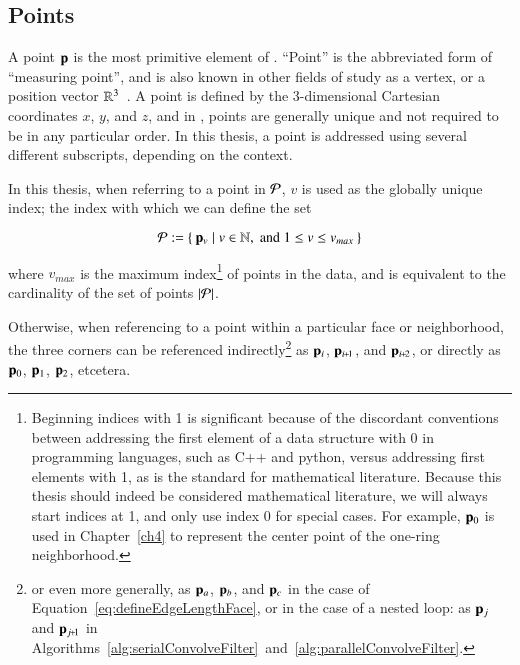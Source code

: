 %
%
%
%
\subsection{Points}
\label{ch2sTDDssP}
A point $\mathbf{p}$ is the most primitive element of \tdd{}. ``Point'' is the abbreviated form of ``measuring point'', and is also known in other fields of study as a vertex, or a position vector $\mathbb{R}^{3}$~\cite{Weisstein19l}. A point is defined by the 3-dimensional Cartesian coordinates $x$, $y$, and $z$, and in \tdd{}, points are generally unique and not required to be in any particular order. In this thesis, a point is addressed using several different subscripts, depending on the context.

In this thesis, when referring to a point in $\mathcal{P}$, $v$ is used as the globally unique index; the index with which we can define the set

\begin{equation}
	\mathcal{P} := \left \{\:\mathbf{p}_v \mid v \in \mathbb{N}, \;\text{and}\; 1\leq v \leq v_{max}\:\right \}
	\label{eq:defineSetOfPoints}
\end{equation}

where $v_{max}$ is the maximum index\footnote{\label{indicesFootnote}Beginning indices with 1 is significant because of the discordant conventions between addressing the first element of a data structure with 0 in programming languages, such as C++ and python, versus addressing first elements with 1, as is the standard for mathematical literature. Because this thesis should indeed be considered mathematical literature, we will always start indices at 1, and only use index 0 for special cases. For example, $\mathbf{p}_0$ is used in Chapter~\ref{ch4} to represent the center point of the one-ring neighborhood.} of points in the data, and is equivalent to the cardinality of the set of points $|\mathcal{P}|$.%
%
%

Otherwise, when referencing to a point within a particular face or neighborhood, the three corners can be referenced indirectly\footnote{or even more generally, as $\mathbf{p}_a$, $\mathbf{p}_b$, and $\mathbf{p}_c$ in the case of Equation~\ref{eq:defineEdgeLengthFace}, or in the case of a nested loop: as $\mathbf{p}_j$ and $\bp_{\sjpo}$ in Algorithms~\ref{alg:serialConvolveFilter}~and~\ref{alg:parallelConvolveFilter}.} as $\mathbf{p}_i$, $\bp_{\sipo}$, and $\bp_{\sipt}$, or directly as $\mathbf{p}_0$, $\mathbf{p}_1$, $\mathbf{p}_2$, etcetera.~\cite[p.~25]{Mara12}%
%


